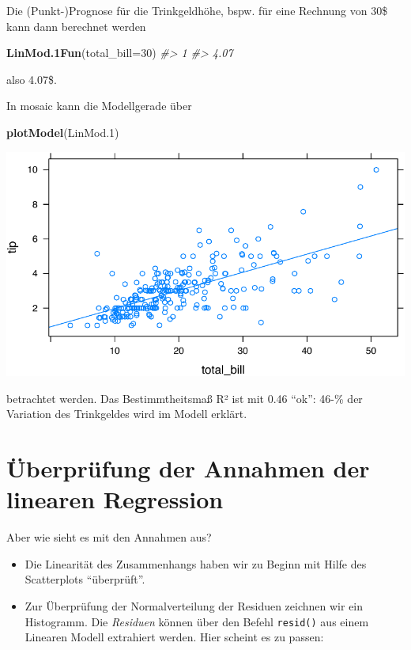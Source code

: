 \documentclass[12pt,]{book}
\newenvironment{Shaded}{\begin{snugshade}}{\end{snugshade}}
\newcommand{\KeywordTok}[1]{\textcolor[rgb]{0.13,0.29,0.53}{\textbf{{#1}}}}
\newcommand{\DataTypeTok}[1]{\textcolor[rgb]{0.13,0.29,0.53}{{#1}}}
\newcommand{\DecValTok}[1]{\textcolor[rgb]{0.00,0.00,0.81}{{#1}}}
\newcommand{\FloatTok}[1]{\textcolor[rgb]{0.00,0.00,0.81}{{#1}}}
\newcommand{\CommentTok}[1]{\textcolor[rgb]{0.56,0.35,0.01}{\textit{{#1}}}}
\newcommand{\NormalTok}[1]{{#1}}
\providecommand{\tightlist}{%
  \setlength{\itemsep}{0pt}\setlength{\parskip}{0pt}}
\begin{document}
Die (Punkt-)Prognose für die Trinkgeldhöhe, bspw. für eine Rechnung von
30\$ kann dann berechnet werden

\begin{Shaded}
\begin{Highlighting}[]
\KeywordTok{LinMod.1Fun}\NormalTok{(}\DataTypeTok{total_bill=}\DecValTok{30}\NormalTok{)}
\CommentTok{#>    1 }
\CommentTok{#> 4.07}
\end{Highlighting}
\end{Shaded}

also 4.07\$.

In mosaic kann die Modellgerade über

\begin{Shaded}
\begin{Highlighting}[]
\KeywordTok{plotModel}\NormalTok{(LinMod}\FloatTok{.1}\NormalTok{)}
\end{Highlighting}
\end{Shaded}

\begin{center}\includegraphics[width=0.7\linewidth]{071_Regression_files/figure-latex/unnamed-chunk-6-1} \end{center}

betrachtet werden. Das Bestimmtheitsmaß R² ist mit 0.46 ``ok'': 46-\%
der Variation des Trinkgeldes wird im Modell erklärt.

\section{Überprüfung der Annahmen der linearen
Regression}\label{uberprufung-der-annahmen-der-linearen-regression}

Aber wie sieht es mit den Annahmen aus?

\begin{itemize}
\tightlist
\item
  Die Linearität des Zusammenhangs haben wir zu Beginn mit Hilfe des
  Scatterplots ``überprüft''.
\item
  Zur Überprüfung der Normalverteilung der Residuen zeichnen wir ein
  Histogramm. Die \emph{Residuen} können über den Befehl
  \texttt{resid()} aus einem Linearen Modell extrahiert werden. Hier
  scheint es zu passen:
\end{itemize}
\end{document}
